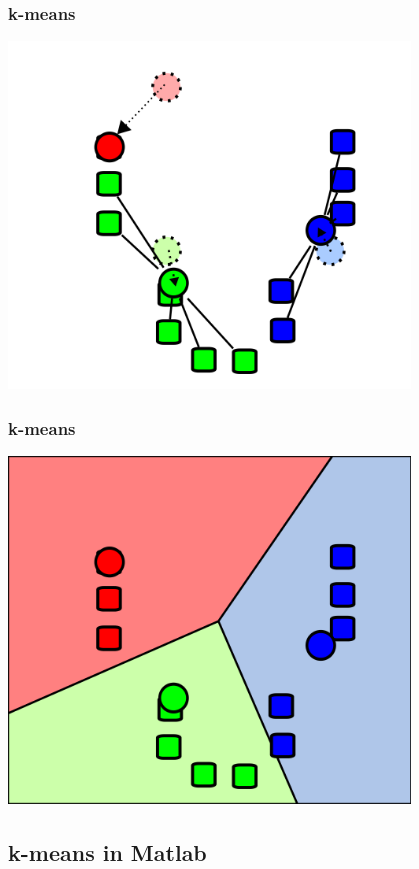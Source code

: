 \documentclass{beamer}
\begin{document}
\begin{frame}
\frametitle{k-means}
\begin{center}
\includegraphics[width=0.8\textwidth]{km3.png}
\end{center}
\end{frame}

\begin{frame}
\frametitle{k-means}
\begin{center}
\includegraphics[width=0.8\textwidth]{km4.png}
\end{center}
\end{frame}

\subsection{k-means in Matlab}
\end{document}
